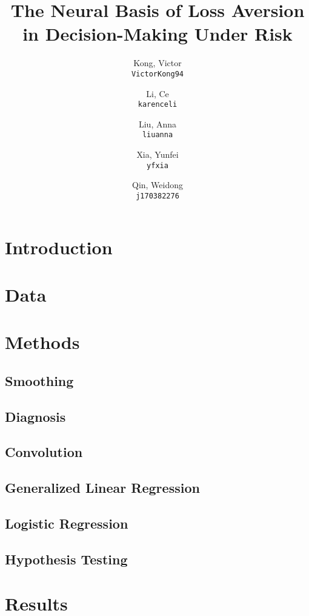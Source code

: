 \documentclass[11pt]{article}
\title{The Neural Basis of Loss Aversion in Decision-Making Under Risk}
\author{
  Kong, Victor\\
  \texttt{VictorKong94}
  \and
  Li, Ce\\
  \texttt{karenceli}
  \and
  Liu, Anna\\
  \texttt{liuanna}
  \and
  Xia, Yunfei\\
  \texttt{yfxia}
  \and
  Qin, Weidong\\
  \texttt{j170382276}
}
\begin{document}
\maketitle

\abstract{}

\section{Introduction}
        

\section{Data}
        

\section{Methods}

    \subsection{Smoothing}
            
    \subsection{Diagnosis}
            
    \subsection{Convolution}
            
    \subsection{Generalized Linear Regression}
            
    \subsection{Logistic Regression}
            
    \subsection{Hypothesis Testing}
            

\section{Results}
\end{document}
